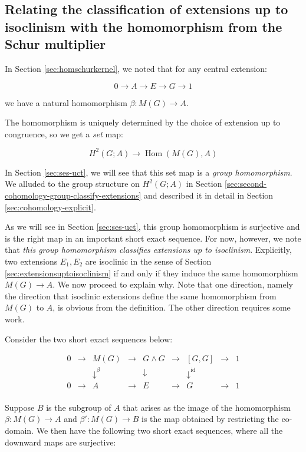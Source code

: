 \documentclass{ucetd}
\begin{document}
\subsection{Relating the classification of extensions up to isoclinism with the homomorphism from the Schur multiplier}\label{sec:beta-map}

In Section \ref{sec:homschurkernel}, we noted that for any central extension:

$$0 \to A \to E \to G \to 1$$

we have a natural homomorphism $\beta: M(G) \to A$.

The homomorphism is uniquely determined by the choice of extension up
to congruence, so we get a {\em set} map:

$$H^2(G;A) \to \operatorname{Hom}(M(G),A)$$

In Section \ref{sec:ses-uct}, we will see that this set map is a {\em
  group homomorphism}. We alluded to the group structure on $H^2(G;A)$
in Section \ref{sec:second-cohomology-group-classify-extensions} and
described it in detail in Section \ref{sec:cohomology-explicit}.

As we will see in Section \ref{sec:ses-uct}, this group homomorphism
is surjective and is the right map in an important short exact
sequence. For now, however, we note that {\em this group homomorphism
  classifies extensions up to isoclinism}. Explicitly, two extensions
$E_1,E_2$ are isoclinic in the sense of Section
\ref{sec:extensionsuptoisoclinism} if and only if they induce the same
homomorphism $M(G) \to A$. We now proceed to explain why. Note that
one direction, namely the direction that isoclinic extensions define
the same homomorphism from $M(G)$ to $A$, is obvious from the
definition. The other direction requires some work.

Consider the two short exact sequences below:

$$\begin{array}{ccccccccc}
0 & \to & M(G) & \to & G \wedge G & \to & [G,G] & \to & 1\\
 &&   \downarrow^{\beta}  &&  \downarrow     && \downarrow^{\text{id}} && \\
0 & \to & A &\to & E & \to & G & \to & 1\\
\end{array}$$

Suppose $B$ is the subgroup of $A$ that arises as the image of the
homomorphism $\beta: M(G) \to A$ and $\beta':M(G) \to B$ is the map
obtained by restricting the co-domain. We then have the following two
short exact sequences, where all the downward maps are surjective:
\end{document}
